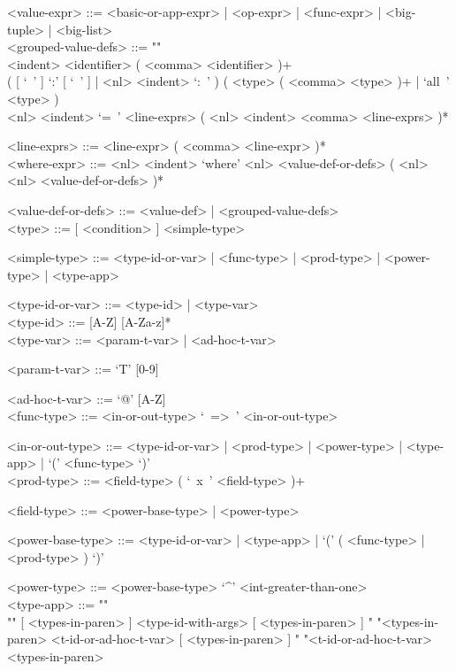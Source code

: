 \documentclass{article}
\begin{document}
\begin{grammar}
<value-expr> ::=
<basic-or-app-expr> | <op-expr> | <func-expr> | <big-tuple> | <big-list>
\\

<grouped-value-defs> ::= ""\\
<indent> <identifier> ( <comma> <identifier> )+ \\
( [ `\ ' ] `:' [ `\ ' ] | <nl> <indent> `:\ ' )
( <type> ( <comma> <type> )+ | `all\ ' <type> ) \\
<nl> <indent> `=\ ' <line-exprs> ( <nl> <indent> <comma> <line-exprs> )*

<line-exprs> ::= <line-expr> ( <comma> <line-expr> )*
\\

<where-expr> ::=
<nl> <indent> `where' <nl> <value-def-or-defs> ( <nl> <nl> <value-def-or-defs> )*

<value-def-or-defs> ::= <value-def> | <grouped-value-defs> 
\\

<type> ::= [ <condition> ]  <simple-type> 

<simple-type> ::=
<type-id-or-var> | <func-type> | <prod-type> | <power-type> | <type-app>

<type-id-or-var> ::= <type-id> | <type-var>
\\

<type-id> ::= [A-Z] [A-Za-z]*
\\

<type-var> ::= <param-t-var> | <ad-hoc-t-var> 

<param-t-var> ::= `T' [0-9] 

<ad-hoc-t-var> ::= `@' [A-Z] 
\\

<func-type> ::= <in-or-out-type> `\ =>\ ' <in-or-out-type>

<in-or-out-type> ::=
<type-id-or-var> | <prod-type> | <power-type> | <type-app> | `(' <func-type> `)'
\\

<prod-type> ::= <field-type> ( `\ x\ ' <field-type> )+

<field-type> ::= <power-base-type> | <power-type>

<power-base-type> ::=
<type-id-or-var> | <type-app> | `(' ( <func-type> | <prod-type> ) `)'

<power-type> ::= <power-base-type> `^' <int-greater-than-one>
\\

<type-app> ::= ""\\""
[ <types-in-paren> ] <type-id-with-args> [ <types-in-paren> ]
\alt " "<types-in-paren> <t-id-or-ad-hoc-t-var> [ <types-in-paren> ]
\alt " "<t-id-or-ad-hoc-t-var> <types-in-paren>


\end{grammar}
\end{document}
